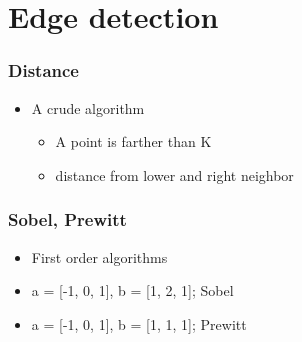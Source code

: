 \documentclass[presentation]{beamer}
\begin{document}
\section{Edge detection}
\label{sec-5}
\begin{frame}
\frametitle{Distance}
\label{sec-5_1}

\begin{itemize}
\item A crude algorithm

\begin{itemize}
\item A point is farther than K
\item distance from lower and right neighbor
\end{itemize}

\end{itemize}
\end{frame}
\begin{frame}
\frametitle{Sobel, Prewitt}
\label{sec-5_2}

\begin{itemize}
\item First order algorithms
\item a = [-1, 0, 1], b = [1, 2, 1]; Sobel
\item a = [-1, 0, 1], b = [1, 1, 1]; Prewitt
\end{itemize}
\end{frame}
\end{document}
